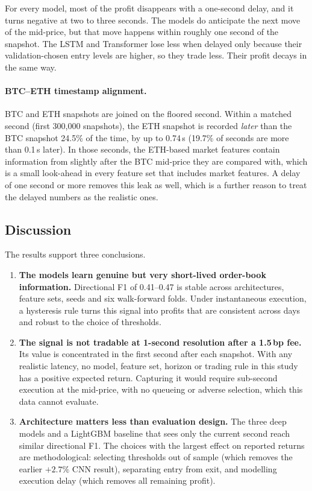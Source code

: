For every model, most of the profit disappears with a one-second delay, and it turns
negative at two to three seconds. The models do anticipate the next move of the
mid-price, but that move happens within roughly one second of the snapshot. The LSTM and
Transformer lose less when delayed only because their validation-chosen entry levels are
higher, so they trade less. Their profit decays in the same way.

\paragraph{BTC--ETH timestamp alignment.} BTC and ETH snapshots are joined on the
floored second. Within a matched second (first 300,000 snapshots), the ETH snapshot is
recorded \emph{later} than the BTC snapshot 24.5\% of the time, by up to 0.74\,s (19.7\% of
seconds are more than 0.1\,s later). In those seconds, the ETH-based market features
contain information from slightly after the BTC mid-price they are compared with, which
is a small look-ahead in every feature set that includes market features. A delay of one
second or more removes this leak as well, which is a further reason to treat the delayed
numbers as the realistic ones.

\subsection{Discussion}
\label{sec:discussion}

The results support three conclusions.

\begin{enumerate}
  \item \textbf{The models learn genuine but very short-lived order-book information.}
  Directional F1 of 0.41--0.47 is stable across architectures, feature sets, seeds and six
  walk-forward folds. Under instantaneous execution, a hysteresis rule turns this signal into
  profits that are consistent across days and robust to the choice of thresholds.
  \item \textbf{The signal is not tradable at 1-second resolution after a 1.5\,bp fee.} Its
  value is concentrated in the first second after each snapshot. With any realistic
  latency, no model, feature set, horizon or trading rule in this study has a positive
  expected return. Capturing it would require sub-second execution at the mid-price, with no
  queueing or adverse selection, which this data cannot evaluate.
  \item \textbf{Architecture matters less than evaluation design.} The three deep models
  and a LightGBM baseline that sees only the current second reach similar directional F1. The
  choices with the largest effect on reported returns are methodological: selecting
  thresholds out of sample (which removes the earlier $+2.7\%$ CNN result), separating entry
  from exit, and modelling execution delay (which removes all remaining profit).
\end{enumerate}

